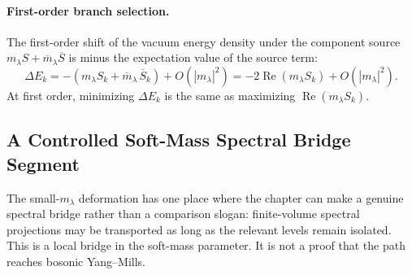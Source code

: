 \paragraph{First-order branch selection.}
The first-order shift of the vacuum energy density under the component source
\(m_\lambda S+\overline m_\lambda\overline S\) is minus the expectation value
of the source term:
\[
  \Delta E_k
  =
  -
  \left(m_\lambda S_k+\overline m_\lambda\,\overline S_k\right)
  +O(|m_\lambda|^2)
  =
  -2\operatorname{Re}(m_\lambda S_k)+O(|m_\lambda|^2).
\]
At first order, minimizing \(\Delta E_k\) is the same as maximizing
\(\operatorname{Re}(m_\lambda S_k)\).

\subsection{A Controlled Soft-Mass Spectral Bridge Segment}
\label{sec:susy-soft-mass-spectral-bridge-segment}

The small-\(m_\lambda\) deformation has one place where the chapter can make
a genuine spectral bridge rather than a comparison slogan: finite-volume
spectral projections may be transported as long as the relevant levels remain
isolated.  This is a local bridge in the soft-mass parameter.  It is not a
proof that the path reaches bosonic Yang--Mills.

